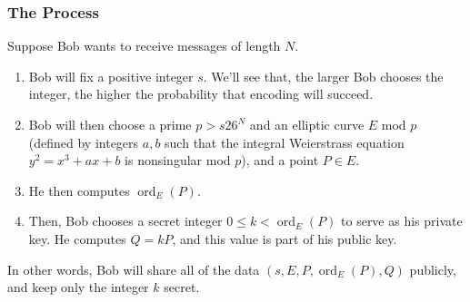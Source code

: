 \documentclass[letterpaper]{article}
\DeclareMathOperator{\ord}{ord}
\begin{document}
\subsubsection{The Process}
Suppose Bob wants to receive messages of length $N$. 
\begin{enumerate}
    \item Bob will fix a positive integer $s$. We'll see that, the larger Bob chooses the integer, the higher the probability that encoding will succeed. 
    \item Bob will then choose a prime $p > s26^N$ and an elliptic curve $E$ mod $p$ (defined by integers $a, b$ such that the integral Weierstrass equation $y^2 = x^3 + ax + b$ is nonsingular mod $p$), and a point $P \in E$. 
    \item He then computes $\ord_{E}(P)$. 
    \item Then, Bob chooses a secret integer $0 \leq k < \ord_{E}(P)$ to serve as his private key. He computes $Q = kP$, and this value is part of his public key. 
\end{enumerate}
In other words, Bob will share all of the data $(s, E, P, \ord_{E}(P), Q)$ publicly, and keep only the integer $k$ secret.

\bigskip 
\end{document}
